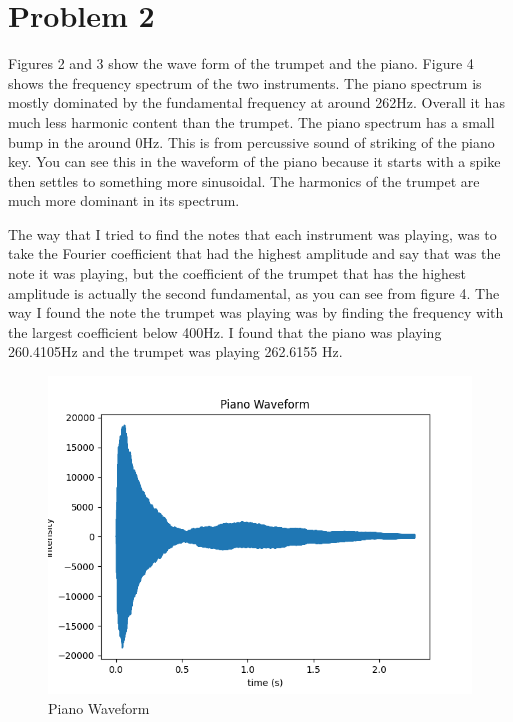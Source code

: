 \documentclass{article}
\begin{document}
\section{Problem 2}

 Figures 2 and 3 show the wave form of the trumpet and the piano. Figure 4 shows  the  frequency spectrum of the two instruments. The piano spectrum is mostly dominated by the fundamental frequency at around 262Hz. Overall it has much less harmonic content than the trumpet. The piano spectrum has a small bump in the around 0Hz. This is from percussive sound of striking of the piano key. You can see this in the waveform of the piano because it starts with a spike then settles to something more sinusoidal. The harmonics of the trumpet are much more dominant in its spectrum. \par
 The way that I tried to find the notes that each instrument was playing, was to take the Fourier coefficient that had the highest amplitude and say that was the note it was playing, but the coefficient of the trumpet that has the highest amplitude is actually the second fundamental, as you can see from figure 4. The way I found the note the trumpet was playing was by finding the frequency with the largest coefficient below 400Hz. I found that the piano was playing 260.4105Hz and the trumpet was playing 262.6155 Hz.

 \begin{figure}
     \centering
     \includegraphics[width=\linewidth]{piano.png}
     \caption{Piano Waveform}
     \label{fig:enter-label}
 \end{figure}
\end{document}
